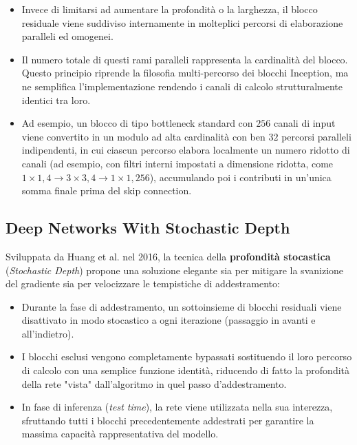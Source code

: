 ﻿\documentclass[11pt, a4paper]{article}
\begin{document}
\begin{itemize}
    \item Invece di limitarsi ad aumentare la profondità o la larghezza, il blocco residuale viene suddiviso internamente in molteplici percorsi di elaborazione paralleli ed omogenei.
    \item Il numero totale di questi rami paralleli rappresenta la cardinalità del blocco. Questo principio riprende la filosofia multi-percorso dei blocchi Inception, ma ne semplifica l'implementazione rendendo i canali di calcolo strutturalmente identici tra loro.
    \item Ad esempio, un blocco di tipo bottleneck standard con $256$ canali di input viene convertito in un modulo ad alta cardinalità con ben $32$ percorsi paralleli indipendenti, in cui ciascun percorso elabora localmente un numero ridotto di canali (ad esempio, con filtri interni impostati a dimensione ridotta, come $1 \times 1, 4 \to 3 \times 3, 4 \to 1 \times 1, 256$), accumulando poi i contributi in un'unica somma finale prima del skip connection.
\end{itemize}


\subsection{Deep Networks With Stochastic Depth}

Sviluppata da Huang et al. nel 2016, la tecnica della \textbf{profondità stocastica} (\emph{Stochastic Depth}) propone una soluzione elegante sia per mitigare la svanizione del gradiente sia per velocizzare le tempistiche di addestramento:

\begin{itemize}
    \item Durante la fase di addestramento, un sottoinsieme di blocchi residuali viene disattivato in modo stocastico a ogni iterazione (passaggio in avanti e all'indietro).
    \item I blocchi esclusi vengono completamente bypassati sostituendo il loro percorso di calcolo con una semplice funzione identità, riducendo di fatto la profondità della rete "vista" dall'algoritmo in quel passo d'addestramento.
    \item In fase di inferenza (\emph{test time}), la rete viene utilizzata nella sua interezza, sfruttando tutti i blocchi precedentemente addestrati per garantire la massima capacità rappresentativa del modello.
\end{itemize}
\end{document}
